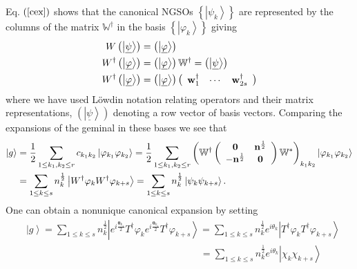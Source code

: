 \documentclass[preprint,aps,showkeys]{revtex4}%
\begin{document}
Eq. $\left(  \ref{cex}\right)  $ shows that the canonical NGSOs $\left\{
\left\vert \psi_{k}\right\rangle \right\}  $ are represented by the columns of
the matrix $\mathbb{W}^{\dagger}$ in the basis $\left\{  \left\vert
\varphi_{k}\right\rangle \right\}  $ giving
\begin{align}
W\left(  \left\vert \underline{\psi}\right\rangle \right)   &  =\left(
\left\vert \underline{\varphi}\right\rangle \right) \nonumber\\
W^{\dagger}\left(  \left\vert \underline{\varphi}\right\rangle \right)   &
=\left(  \left\vert \underline{\varphi}\right\rangle \right)  \mathbb{W}%
^{\dagger}=\left(  \left\vert \underline{\psi}\right\rangle \right)
\nonumber\\
W^{\dagger}\left(  \left\vert \underline{\varphi}\right\rangle \right)   &
=\left(  \left\vert \underline{\varphi}\right\rangle \right)  \left(
\begin{array}
[c]{ccc}%
\mathbf{w}_{1}^{\dagger} & \cdots & \mathbf{w}_{2s}^{\dagger}%
\end{array}
\right)
\end{align}
where we have used L\"{o}wdin notation \cite{Lowdinbook} relating operators
and their matrix representations, $\left(  \left\vert \underline{\psi
}\right\rangle \right)  $ denoting a row vector of basis vectors. Comparing
the expansions of the geminal in these bases we see that
\begin{align}
\left\vert g\right\rangle  &  =\frac{1}{2}\sum_{1\leq k_{1},k_{2}\leq
r}c_{k_{1}k_{2}}\left\vert \varphi_{k_{1}}\varphi_{k_{2}}\right\rangle
=\frac{1}{2}\sum_{1\leq k_{1},k_{2}\leq r}\left(  \mathbb{W}^{\dagger}\left(
\begin{array}
[c]{cc}%
\mathbf{0} & \mathbf{n}^{\frac{1}{2}}\\
-\mathbf{n}^{\frac{1}{2}} & \mathbf{0}%
\end{array}
\right)  \mathbb{W}^{\ast}\right)  _{k_{1}k_{2}}\left\vert \varphi_{k_{1}%
}\varphi_{k_{2}}\right\rangle \nonumber\\
&  =\sum_{1\leq k\leq s}n_{k}^{\frac{1}{2}}\left\vert W^{\dagger}\varphi
_{k}W^{\dagger}\varphi_{k+s}\right\rangle =\sum_{1\leq k\leq s}n_{k}^{\frac
{1}{2}}\left\vert \psi_{k}\psi_{k+s}\right\rangle .
\end{align}
One can obtain a nonunique canonical expansion by setting
\begin{align}
&  \left\vert g\right\rangle =\sum_{1\leq k\leq s}n_{k}^{\frac{1}{2}%
}\left\vert e^{i\frac{\boldsymbol{\theta}_{k_{1}}}{2}}T^{\dagger}\varphi
_{k}e^{i\frac{\boldsymbol{\theta}_{k_{1}}}{2}}T^{\dagger}\varphi
_{k+s}\right\rangle =\sum_{1\leq k\leq s}n_{k}^{\frac{1}{2}}e^{i\theta_{k}%
}\left\vert T^{\dagger}\varphi_{k}T^{\dagger}\varphi_{k+s}\right\rangle
\nonumber\\
&  \left.  \qquad\qquad\qquad\qquad\qquad\qquad\qquad\qquad\qquad\right.
=\sum_{1\leq k\leq s}n_{k}^{\frac{1}{2}}e^{i\theta_{k}}\left\vert \chi_{k}%
\chi_{k+s}\right\rangle
\end{align}
\end{document}
